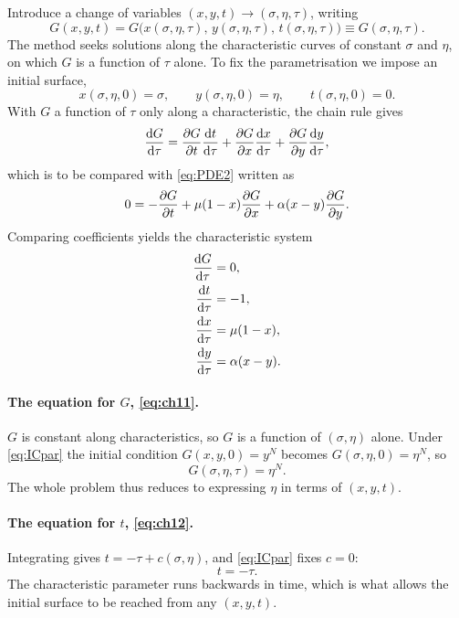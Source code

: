 Introduce a change of variables $(x,y,t)\to(\sigma,\eta,\tau)$, writing
\begin{equation*}
G(x,y,t) = G\bigl(x(\sigma,\eta,\tau),\,y(\sigma,\eta,\tau),\,t(\sigma,\eta,\tau)\bigr)
\equiv G(\sigma,\eta,\tau).
\end{equation*}
The method seeks solutions along the characteristic curves of constant $\sigma$ and
$\eta$, on which $G$ is a function of $\tau$ alone. To fix the parametrisation we
impose an initial surface,
\begin{equation}
\label{eq:ICpar}
x(\sigma,\eta,0) = \sigma,
\qquad
y(\sigma,\eta,0) = \eta,
\qquad
t(\sigma,\eta,0) = 0 .
\end{equation}
With $G$ a function of $\tau$ only along a characteristic, the chain rule gives
\begin{equation*}
\frac{\mathrm{d} G}{\mathrm{d} \tau} = \frac{\partial G}{\partial t}\frac{\mathrm{d} t}{\mathrm{d} \tau} + \frac{\partial G}{\partial x}\frac{\mathrm{d} x}{\mathrm{d} \tau} + \frac{\partial G}{\partial y}\frac{\mathrm{d} y}{\mathrm{d} \tau},
\end{equation*}
which is to be compared with \cref{eq:PDE2} written as
\begin{equation*}
0 = -\frac{\partial G}{\partial t} + \mu(1-x)\frac{\partial G}{\partial x} + \alpha(x-y)\frac{\partial G}{\partial y} .
\end{equation*}
Comparing coefficients yields the characteristic system
\begin{align}
\frac{\mathrm{d} G}{\mathrm{d} \tau} &= 0, \label{eq:ch11}\\
\frac{\mathrm{d} t}{\mathrm{d} \tau} &= -1, \label{eq:ch12}\\
\frac{\mathrm{d} x}{\mathrm{d} \tau} &= \mu(1-x), \label{eq:ch13}\\
\frac{\mathrm{d} y}{\mathrm{d} \tau} &= \alpha(x-y). \label{eq:ch14}
\end{align}

\paragraph{The equation for $G$, \eqref{eq:ch11}.}
$G$ is constant along characteristics, so $G$ is a function of $(\sigma,\eta)$
alone. Under \cref{eq:ICpar} the initial condition $G(x,y,0)=y^N$ becomes
$G(\sigma,\eta,0)=\eta^N$, so
\begin{equation}
\label{eq:GetaN}
G(\sigma,\eta,\tau) = \eta^N .
\end{equation}
The whole problem thus reduces to expressing $\eta$ in terms of $(x,y,t)$.

\paragraph{The equation for $t$, \eqref{eq:ch12}.}
Integrating gives $t = -\tau + c(\sigma,\eta)$, and \cref{eq:ICpar} fixes $c=0$:
\begin{equation}
\label{eq:minustau}
t = -\tau .
\end{equation}
The characteristic parameter runs backwards in time, which is what allows the
initial surface to be reached from any $(x,y,t)$.

